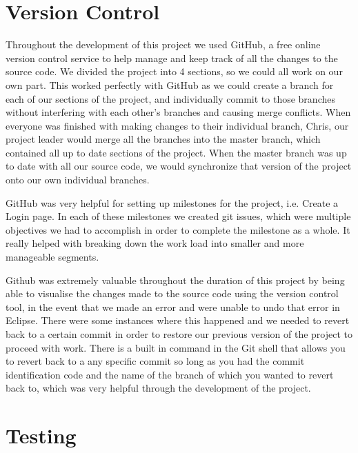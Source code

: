 \section{Version Control}
Throughout the development of this project we used GitHub, a free online version control service to help manage and keep track of all the changes to the source code. We divided the project into 4 sections, so we could all work on our own part. This worked perfectly with GitHub as we could create a branch for each of our sections of the project, and individually commit to those branches without interfering with each other’s branches and causing merge conflicts. When everyone was finished with making changes to their individual branch, Chris, our project leader would merge all the branches into the master branch, which contained all up to date sections of the project. When the master branch was up to date with all our source code, we would synchronize that version of the project onto our own individual branches. \par
GitHub was very helpful for setting up milestones for the project, i.e. Create a Login page. In each of these milestones we created git issues, which were multiple objectives we had to accomplish in order to complete the milestone as a whole. It really helped with breaking down the work load into smaller and more manageable segments.\par
Github was extremely valuable throughout the duration of this project by being able to visualise the changes made to the source code using the version control tool, in the event that we made an error and were unable to
undo that error in Eclipse. There were some instances where this happened and we needed to revert back to a certain commit in order to restore our previous version of the project to proceed with work. There is a built in command in the Git shell that allows you to revert back to a any specific commit so long as you had the commit identification code and the name of the branch of which you wanted to revert back to, which was very helpful through the development of the project.

\section{Testing}

